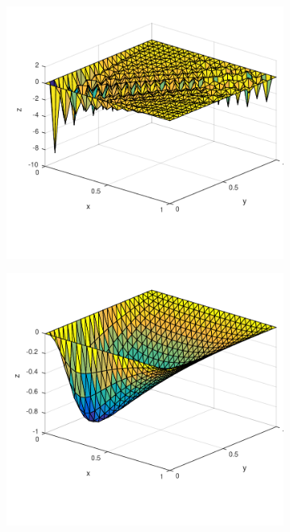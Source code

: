 \begin{figure}[h!]
  \centering
  \begin{subfigure}[b]{0.48\textwidth}
	\includegraphics[width=\textwidth]{Figures/FEM_difftrans_aPos.pdf}
  \end{subfigure}%
  \quad
  \begin{subfigure}[b]{0.48\textwidth}
	\includegraphics[width=\textwidth]{Figures/LSFEM_difftrans_aPos.pdf}

\end{subfigure}
\end{figure}
